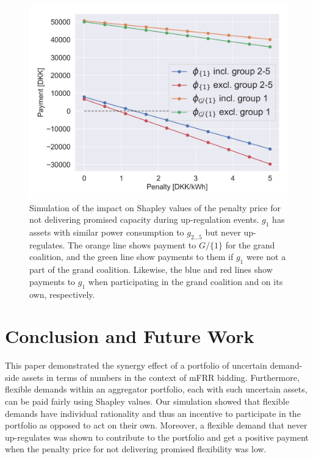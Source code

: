 \documentclass[conference]{IEEEtran}
\begin{document}
\begin{figure}[!t]
    \centering
    \includegraphics[width=\columnwidth]{figures/shapley_values.png}
    \caption{Simulation of the impact on Shapley values of the penalty price for not delivering promised capacity during up-regulation events. $g_1$ has assets with similar power consumption to $g_{2\hdots 5}$ but never up-regulates. The orange line shows payment to $G / \{1\}$ for the grand coalition, and the green line show payments to them if $g_1$ were not a part of the grand coalition. Likewise, the blue and red lines show payments to $g_1$ when participating in the grand coalition and on its own, respectively.}
    \label{fig:shapley_values}
\end{figure}


\section{Conclusion and Future Work}
\label{chapter4}

This paper demonstrated the synergy effect of a portfolio of uncertain demand-side assets in terms of numbers in the context of mFRR bidding. Furthermore, flexible demands within an aggregator portfolio, each with such uncertain assets, can be paid fairly using Shapley values. Our simulation showed that flexible demands have individual rationality and thus an incentive to participate in the portfolio as opposed to act on their own. Moreover, a flexible demand that never up-regulates was shown to contribute to the portfolio and get a positive payment when the penalty price for not delivering promised flexibility was low.
\end{document}
